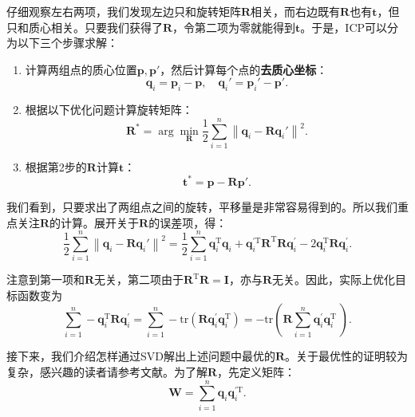 仔细观察左右两项，我们发现左边只和旋转矩阵$\bm{R}$相关，而右边既有$\bm{R}$也有$\bm{t}$，但只和质心相关。只要我们获得了$\bm{R}$，令第二项为零就能得到$\bm{t}$。于是，ICP可以分为以下三个步骤求解：

\begin{mdframed}
\begin{enumerate}
	\item 计算两组点的质心位置$\bm{p}, \bm{p}'$，然后计算每个点的\textbf{去质心坐标}：
	\[
	\bm{q}_i = \bm{p}_i - \bm{p}, \quad \bm{q}_i' = \bm{p}_i' - \bm{p}'.
	\]
	\item 根据以下优化问题计算旋转矩阵：
	\begin{equation}
		\bm{R}^* = \arg \mathop {\min }\limits_{\bm{R}} \frac{1}{2}\sum\limits_{i = 1}^n {{\left\| {{\bm{q}_i} - \bm{R} \bm{q}_i' } \right\|}^2}.
	\end{equation}
	\item 根据第2步的$\bm{R}$计算$\bm{t}$：
	\begin{equation}
	\label{eq:pnp-solve-t}
	\bm{t}^* = \bm{p} - \bm{R} \bm{p}'.
	\end{equation}
\end{enumerate}
\end{mdframed}
	
我们看到，只要求出了两组点之间的旋转，平移量是非常容易得到的。所以我们重点关注$\bm{R}$的计算。展开关于$\bm{R}$的误差项，得：
\begin{equation}
 \frac{1}{2}\sum\limits_{i = 1}^n \left\| {{\bm{q}_i} - \bm{R} \bm{q}_i' } \right\|^2 = \frac{1}{2}\sum\limits_{i = 1}^n \bm{q}_i^\mathrm{T} \bm{q}_i + \bm{q}_i^{ \prime \mathrm{T}}  \bm{R}^\mathrm{T} \bm{R} \bm{q}^\prime_i - 2\bm{q}_i^\mathrm{T} \bm{R} \bm{q}^\prime_i.
\end{equation}

注意到第一项和$\bm{R}$无关，第二项由于$\bm{R}^\mathrm{T}\bm{R}=\bm{I}$，亦与$\bm{R}$无关。因此，实际上优化目标函数变为
\begin{equation}
\sum\limits_{i = 1}^n - \bm{q}_i^\mathrm{T} \bm{R} \bm{q}^\prime_i = \sum\limits_{i = 1}^n -\mathrm{tr} \left( \bm{R} \bm{q}_i^{\prime} \bm{q}^{\mathrm{T}}_i \right) = - \mathrm{tr} \left( \bm{R} \sum\limits_{i = 1}^n \bm{q}_i^{\prime} \bm{q}^{\mathrm{T}}_i \ \right).
\end{equation}

接下来，我们介绍怎样通过SVD解出上述问题中最优的$\bm{R}$。关于最优性的证明较为复杂，感兴趣的读者请参考文献\cite{Arun1987, PomerleauColasSiegwart2015}。为了解$\bm{R}$，先定义矩阵：
\begin{equation}
\bm{W} =  \sum\limits_{i = 1}^n \bm{q}_i \bm{q}^{\prime \mathrm{T}}_i.
\end{equation}

